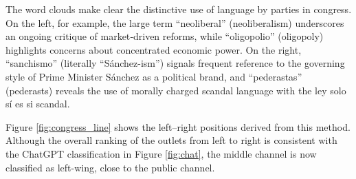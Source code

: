 \documentclass[12pt]{article}
\begin{document}
The word clouds make clear the distinctive use of language by parties in congress. On the left, for example, the large term “neoliberal” (neoliberalism) underscores an ongoing critique of market‐driven reforms, while “oligopolio” (oligopoly) highlights concerns about concentrated economic power. On the right, “sanchismo” (literally “Sánchez-ism”) signals frequent reference to the governing style of Prime Minister Sánchez as a political brand, and “pederastas” (pederasts) reveals the use of morally charged scandal language with the ley solo sí es si scandal. 





Figure \ref{fig:congress_line} shows the left–right positions derived from this method. Although the overall ranking of the outlets from left to right is consistent with the ChatGPT classification in Figure \ref{fig:chat}, the middle channel is now classified as left-wing, close to the public channel. 

\end{document}
